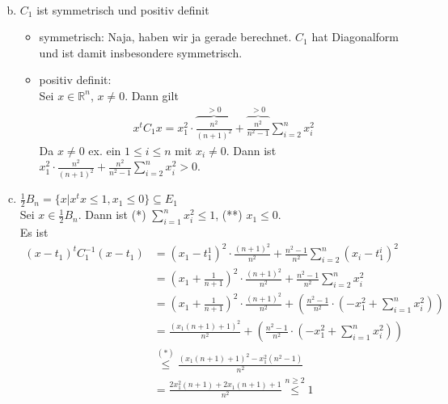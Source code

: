 \documentclass[11pt,a4paper,ngerman]{article}
\begin{document}
\begin{enumerate}[(a)]
\begin{equation*}
\begin{split}
    \end{split}\end{equation*}
\item $C_1$ ist symmetrisch und positiv definit \\
      \begin{itemize}
        \item symmetrisch: Naja, haben wir ja gerade berechnet. $C_1$ hat Diagonalform und ist damit
              insbesondere symmetrisch.
        \item positiv definit: \\
              Sei $x \in \mathbb{R}^n$, $x \neq 0$. Dann gilt
              \begin{equation}\label{eq:2}\begin{split}
                x^t C_1 x = x_1^2 \cdot \overbrace{\frac{n^2}{(n+1)^2}}^{> 0}
                            + \overbrace{\frac{n^2}{n^2-1}}^{> 0} \sum_{i=2}^n  x_i^2
              \end{split}\end{equation}
              Da $x \neq 0$ ex. ein $1 \leq i \leq n$ mit $x_i \neq 0$. Dann ist
              $x_1^2 \cdot \frac{n^2}{(n+1)^2} + \frac{n^2}{n^2-1} \sum_{i=2}^n  x_i^2 > 0$.
      \end{itemize}
\item $\frac{1}{2}B_n = \{x| x^tx \leq 1, x_1 \leq 0 \} \subseteq E_1$ \\
      Sei $x \in \frac{1}{2}B_n$. Dann ist (*) $\sum_{i=1}^n x_i^2 \leq 1$, (**) $x_1 \leq 0$.\\
      Es ist 
      \begin{equation*}\begin{split}
        (x-t_1)^t C_1^{-1} (x-t_1) &= (x_1 - t_1^1)^2 \cdot \frac{(n+1)^2}{n^2} + \frac{n^2-1}{n^2} \sum_{i=2}^n  (x_i - t_1^i)^2 \\
        &= (x_1 + \frac{1}{n+1})^2 \cdot \frac{(n+1)^2}{n^2} + \frac{n^2-1}{n^2} \sum_{i=2}^n  x_i^2 \\
        &= (x_1 + \frac{1}{n+1})^2 \cdot \frac{(n+1)^2}{n^2} + \left( \frac{n^2-1}{n^2} \cdot (- x_1^2 + \sum_{i=1}^n  x_i^2) \right) \\
        &= \frac{(x_1(n+1) + 1)^2}{n^2} + \left( \frac{n^2-1}{n^2} \cdot (- x_1^2 + \sum_{i=1}^n  x_i^2) \right) \\
        &\stackrel{(*)}{\leq} \frac{(x_1(n+1) + 1)^2 - x_1^2(n^2 -1)}{n^2} \\
        &= \frac{2x_1^2 (n+1) + 2x_1 (n+1) + 1}{n^2} \stackrel{n \geq 2}{\leq} 1
      \end{split}\end{equation*}
\end{enumerate}

\label{LastPage}
\end{document}
